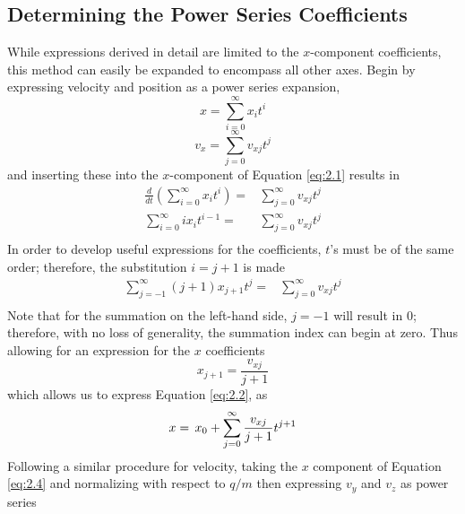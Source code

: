 \documentclass{article}
\begin{document}
\subsection{Determining the Power Series Coefficients}
While expressions derived in detail are limited to the $x$-component coefficients, this method can easily be expanded to encompass all other axes. Begin by expressing velocity and position as a power series expansion,
    \begin{equation}\label{eq:2.2}    
        x=\sum_{i=0}^\infty x_it^i 
    \end{equation}
    \begin{equation}\label{eq:2.3}  
        v_x=\sum_{j=0}^\infty v_{xj}t^j    
    \end{equation}
and inserting these into the $x$-component of Equation \ref{eq:2.1} results in
    \begin{equation}
        \begin{split}
            \frac{d}{dt}\left(\sum_{i=0}^\infty x_it^i\right)=& \sum_{j=0}^\infty v_{xj}t^j\\ 
            \sum_{i=0}^\infty ix_it^{i-1}=&\sum_{j=0}^\infty v_{xj}t^j\\ 
        \end{split}
    \end{equation}
In order to develop useful expressions for the coefficients, $t$'s must be of the same order; therefore, the substitution $i=j+1$ is made   
    \begin{equation}
        \begin{split}
            \sum_{j=-1}^\infty (j+1)x_{j+1}t^{j}=&\sum_{j=0}^\infty v_{xj}t^j\\ 
        \end{split}
    \end{equation}
Note that for the summation on the left-hand side, $j=-1$ will result in 0; therefore, with no loss of generality, the summation index can begin at zero. Thus allowing for an expression for the $x$ coefficients
    \begin{equation}\label{eqn: ith_x_constantb}
        x_{j+1}=\frac{v_{xj}}{j+1}
    \end{equation}
which allows us to express Equation \ref{eq:2.2}, as
    \begin{equation}
        {x=\,x_0 + \sum_{j=0}^\infty\frac{v_{xj}}{j+1} t^{j+1}}\\ 
    \end{equation}
Following a similar procedure for velocity, taking the $x$ component of Equation \ref{eq:2.4} and normalizing with respect to $q/m$ then expressing $v_y$ and $v_z$ as power series 
\end{document}

